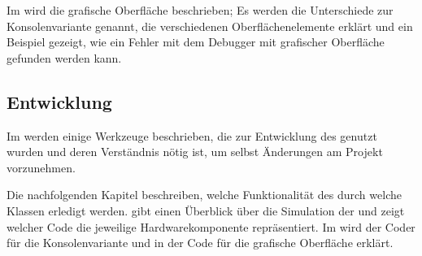 Im  wird die grafische Oberfläche beschrieben; Es werden die Unterschiede zur Konsolenvariante genannt, die verschiedenen Oberflächenelemente erklärt und ein Beispiel gezeigt, wie ein Fehler mit dem Debugger mit grafischer Oberfläche gefunden werden kann.

\subsection*{Entwicklung}
Im  werden einige Werkzeuge beschrieben, die zur Entwicklung des \md{} genutzt wurden und deren Verständnis nötig ist, um selbst Änderungen am Projekt vorzunehmen.

Die nachfolgenden Kapitel beschreiben, welche Funktionalität des \md{} durch welche Klassen erledigt werden.  gibt einen Überblick über die Simulation der \mic{} und zeigt welcher Code die jeweilige Hardwarekomponente repräsentiert. Im  wird der Coder für die Konsolenvariante und in  der Code für die grafische Oberfläche erklärt.